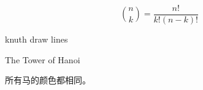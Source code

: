 
\begin{frame}{}
  \begin{exampleblock}{}
    \[
      \binom{n}{k} = \frac{n!}{k! (n-k)!}
    \]
  \end{exampleblock}
\end{frame}

\begin{frame}{}
  \begin{exampleblock}{}
    knuth draw lines
  \end{exampleblock}
\end{frame}

\begin{frame}{}
  \begin{exampleblock}{The Tower of Hanoi}
  \end{exampleblock}
\end{frame}

\begin{frame}{}
\end{frame}

\begin{frame}{}
  \begin{exampleblock}{}
  \end{exampleblock}
\end{frame}

\begin{frame}{}
  \begin{exampleblock}{}
    所有马的颜色都相同。
  \end{exampleblock}
\end{frame}
